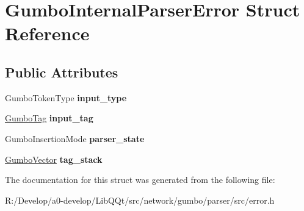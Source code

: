 \hypertarget{struct_gumbo_internal_parser_error}{}\section{Gumbo\+Internal\+Parser\+Error Struct Reference}
\label{struct_gumbo_internal_parser_error}
\subsection*{Public Attributes}
\begin{DoxyCompactItemize}
\item 
\mbox{\label{struct_gumbo_internal_parser_error_a88b4c88bba3646a13394e464bbdf1597}} 
Gumbo\+Token\+Type {\bfseries input\+\_\+type}
\item 
\mbox{\label{struct_gumbo_internal_parser_error_a0abe22582ee1a0cf0f5457e87d8438ff}} 
\mbox{\hyperlink{gumbo_8h_a5a3aa6f4b039f85875d638088e676a0f}{Gumbo\+Tag}} {\bfseries input\+\_\+tag}
\item 
\mbox{\label{struct_gumbo_internal_parser_error_ac3bedb8152e6ae415d2dc3794930d2e9}} 
Gumbo\+Insertion\+Mode {\bfseries parser\+\_\+state}
\item 
\mbox{\label{struct_gumbo_internal_parser_error_ac078a7ea37d19614951d84ff7f1c3916}} 
\mbox{\hyperlink{struct_gumbo_vector}{Gumbo\+Vector}} {\bfseries tag\+\_\+stack}
\end{DoxyCompactItemize}


The documentation for this struct was generated from the following file\+:\begin{DoxyCompactItemize}
\item 
R\+:/\+Develop/a0-\/develop/\+Lib\+Q\+Qt/src/network/gumbo/parser/src/error.\+h\end{DoxyCompactItemize}
